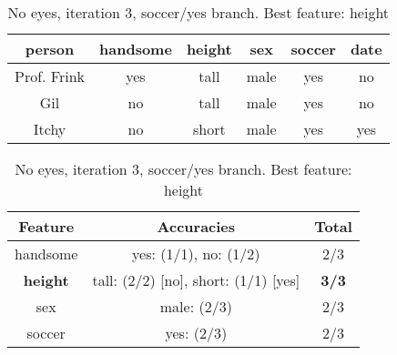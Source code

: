 \begin{table}[h!]
  \centering
  \begin{tabular}{ccccc|c}
    \toprule
    person      & handsome & height & sex    & soccer & date\\
    \midrule
    Prof. Frink & yes      & tall   & male   & yes    & no  \\
    Gil         & no       & tall   & male   & yes    & no  \\
    Itchy       & no       & short  & male   & yes    & yes \\
    \bottomrule
  \end{tabular}

  \vspace{.5cm}

  \begin{tabular}{ccc}
    \toprule
    Feature         & Accuracies                              & Total\\
    \midrule
    handsome        & yes: (1/1), no: (1/2)                   & 2/3\\
    \textbf{height} & tall: (2/2) [no], short: (1/1) [yes]    & \textbf{3/3}\\
    sex             & male: (2/3)                             & 2/3\\
    soccer          & yes: (2/3)                              & 2/3\\
    \bottomrule
  \end{tabular}
  \caption*{No eyes, iteration 3, soccer/yes branch. Best feature: height}
\end{table}
